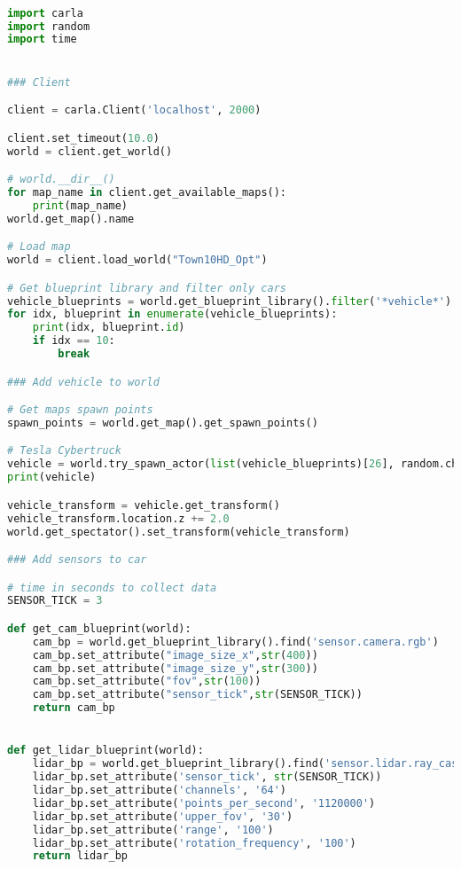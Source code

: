 \begin{lstlisting}[language=Python, caption={Basic starting code for a simple data collection example, using a single vehicle mounted with 2 cameras and a lidar sensor},label={code:starting}]

import carla
import random
import time


### Client

client = carla.Client('localhost', 2000)

client.set_timeout(10.0)
world = client.get_world()

# world.__dir__()
for map_name in client.get_available_maps():
    print(map_name)
world.get_map().name

# Load map
world = client.load_world("Town10HD_Opt")

# Get blueprint library and filter only cars
vehicle_blueprints = world.get_blueprint_library().filter('*vehicle*')
for idx, blueprint in enumerate(vehicle_blueprints):
    print(idx, blueprint.id)
    if idx == 10:
        break

### Add vehicle to world

# Get maps spawn points
spawn_points = world.get_map().get_spawn_points()

# Tesla Cybertruck
vehicle = world.try_spawn_actor(list(vehicle_blueprints)[26], random.choice(spawn_points))
print(vehicle)

vehicle_transform = vehicle.get_transform()
vehicle_transform.location.z += 2.0
world.get_spectator().set_transform(vehicle_transform)

### Add sensors to car

# time in seconds to collect data
SENSOR_TICK = 3

def get_cam_blueprint(world):
    cam_bp = world.get_blueprint_library().find('sensor.camera.rgb')
    cam_bp.set_attribute("image_size_x",str(400))
    cam_bp.set_attribute("image_size_y",str(300))
    cam_bp.set_attribute("fov",str(100))
    cam_bp.set_attribute("sensor_tick",str(SENSOR_TICK))
    return cam_bp


def get_lidar_blueprint(world):
    lidar_bp = world.get_blueprint_library().find('sensor.lidar.ray_cast')
    lidar_bp.set_attribute('sensor_tick', str(SENSOR_TICK))
    lidar_bp.set_attribute('channels', '64')
    lidar_bp.set_attribute('points_per_second', '1120000')
    lidar_bp.set_attribute('upper_fov', '30')
    lidar_bp.set_attribute('range', '100')
    lidar_bp.set_attribute('rotation_frequency', '100')
    return lidar_bp


\end{lstlisting}
